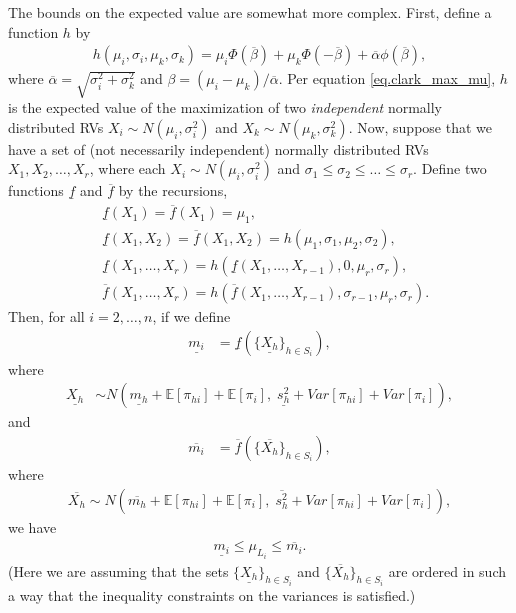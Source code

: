 \documentclass[12pt]{article}
\def\E{\mathbb{E}}
\begin{document}
The bounds on the expected value are somewhat more complex. First, define a function $h$ by
\begin{align*}
  h(\mu_i, \sigma_i, \mu_k, \sigma_k) = \mu_i \Phi(\overline{\beta}) + \mu_k \Phi(-\overline{\beta}) + \overline{\alpha} \phi(\overline{\beta}),
\end{align*}
where $\overline{\alpha} = \sqrt{\sigma_i^2 + \sigma_k^2}$ and $\beta = (\mu_i - \mu_k)/ \overline{\alpha}$. Per equation \eqref{eq.clark_max_mu}, $h$ is the expected value of the maximization of two {\em independent} normally distributed RVs $X_i \sim N(\mu_i, \sigma_i^2)$ and $X_k \sim N(\mu_k, \sigma_k^2)$. Now, suppose that we have a set of (not necessarily independent) normally distributed RVs $X_1, X_2, \dots, X_r$, where each $X_i \sim N(\mu_i, \sigma_i^2)$ and $\sigma_1 \leq \sigma_2 \leq \dots \leq \sigma_r$. Define two functions $\underline{f}$ and $\overline{f}$ by the recursions,
\begin{align*}
  &\underline{f}(X_1) = \overline{f}(X_1) = \mu_1, \\
  &\underline{f}(X_1, X_2) = \overline{f}(X_1, X_2) = h(\mu_1, \sigma_1, \mu_2, \sigma_2), \\
  &\underline{f}(X_1, \dots, X_r) = h(\underline{f}(X_1, \dots, X_{r - 1}), 0, \mu_r, \sigma_r), \\
  &\overline{f}(X_1, \dots, X_r) = h(\overline{f}(X_1, \dots, X_{r - 1}), \sigma_{r - 1}, \mu_r, \sigma_r).
\end{align*}
Then, for all $i = 2, \dots, n$, if we define
\begin{align*}
  \underline{m_i} &= \underline{f}(\{ \underline{X_h} \}_{h \in S_i}),
\end{align*}
where
\begin{align*}
  \underline{X_h} &\sim N(\underline{m_h} + \E[\pi_{hi}] + \E[\pi_{i}], \; \underline{s_h^2} + Var[\pi_{hi}] + Var[\pi_{i}]),
\end{align*}
and
\begin{align*}
  \overline{m_i} &= \overline{f}(\{\overline{X_h}\}_{h \in S_i}),
\end{align*}
where
\begin{align*}
  \overline{X_h} \sim N(\overline{m_h} + \E[\pi_{hi}] + \E[\pi_{i}], \; \overline{s_h^2} + Var[\pi_{hi}] + Var[\pi_{i}]),
  \end{align*}
we have 
\begin{align*}
  \underline{m_i} \leq \mu_{L_i} \leq \overline{m_i}.
\end{align*}
(Here we are assuming that the sets $\{\underline{X_h}\}_{h \in S_i}$ and $\{\overline{X_h}\}_{h \in S_i}$ are ordered in such a way that the inequality constraints on the variances is satisfied.)
\end{document}
